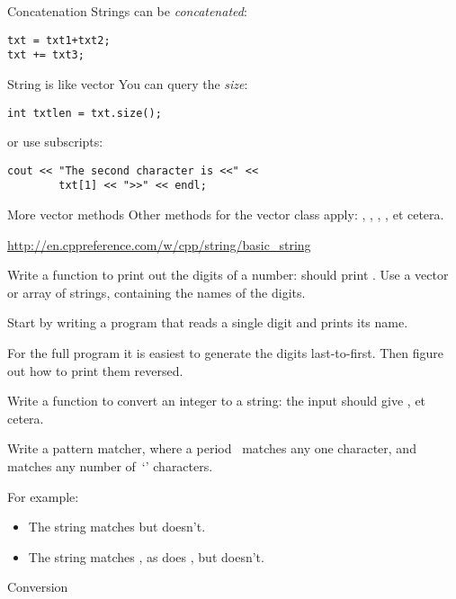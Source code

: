 \begin{block}{Concatenation}
  \label{sl:string-plus}
  Strings can be \emph{concatenated}:
\begin{verbatim}
txt = txt1+txt2;
txt += txt3;
\end{verbatim}
\end{block}

\begin{block}{String is like vector}
  \label{sl:string-vector}
  You can query the \emph{size}:
\begin{verbatim}
int txtlen = txt.size();
\end{verbatim}
or use subscripts:
\begin{verbatim}
cout << "The second character is <<" << 
        txt[1] << ">>" << endl;
\end{verbatim}
\end{block}

\begin{block}{More vector methods}
  \label{sl:string-vector-methods}
  Other methods for the vector class apply: , ,
  , , et cetera.

  \url{http://en.cppreference.com/w/cpp/string/basic_string}
\end{block}

\begin{exercise}
  \label{ex:printdigits}
  Write a function to print out the digits of a number:  should
  print . Use a vector or array of strings, containing
  the names of the digits.

  Start by writing a program that reads a single digit and prints its name.

  For the full program it is easiest to generate the  digits last-to-first.
  Then figure out how to print them reversed.
\end{exercise}

\begin{exercise}
  \label{ex:printnumber}
  Write a function to convert an integer to a string: the input
   should give , et cetera.
\end{exercise}

\begin{exercise}
  Write a pattern matcher, where a period~ matches any one
  character, and  matches any number of~`' characters.

  For example:
  \begin{itemize}
  \item The string  matches  but  doesn't.
  \item The string  matches , as does , but
     doesn't.
  \end{itemize}
\end{exercise}

 {Conversion}


